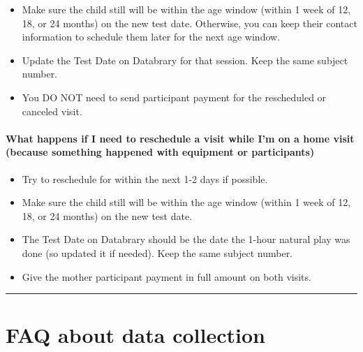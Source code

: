 \documentclass[
]{book}
\providecommand{\tightlist}{%
  \setlength{\itemsep}{0pt}\setlength{\parskip}{0pt}}
\begin{document}
\begin{itemize}
\tightlist
\item
  Make sure the child still will be within the age window (within 1 week of 12, 18, or 24 months) on the new test date. Otherwise, you can keep their contact information to schedule them later for the next age window.
\item
  Update the Test Date on Databrary for that session. Keep the same subject number.
\item
  You DO NOT need to send participant payment for the rescheduled or canceled visit.
\end{itemize}

\hypertarget{what-happens-if-i-need-to-reschedule-a-visit-while-im-on-a-home-visit-because-something-happened-with-equipment-or-participants}{%
\paragraph*{What happens if I need to reschedule a visit while I'm on a home visit (because something happened with equipment or participants)}\label{what-happens-if-i-need-to-reschedule-a-visit-while-im-on-a-home-visit-because-something-happened-with-equipment-or-participants}}

\begin{itemize}
\tightlist
\item
  Try to reschedule for within the next 1-2 days if possible.
\item
  Make sure the child still will be within the age window (within 1 week of 12, 18, or 24 months) on the new test date.
\item
  The Test Date on Databrary should be the date the 1-hour natural play was done (so updated it if needed). Keep the same subject number.
\item
  Give the mother participant payment in full amount on both visits.
\end{itemize}

\begin{center}\rule{0.5\linewidth}{0.5pt}\end{center}

\hypertarget{faqs_collection}{%
\section{FAQ about data collection}\label{faqs_collection}}
\end{document}

